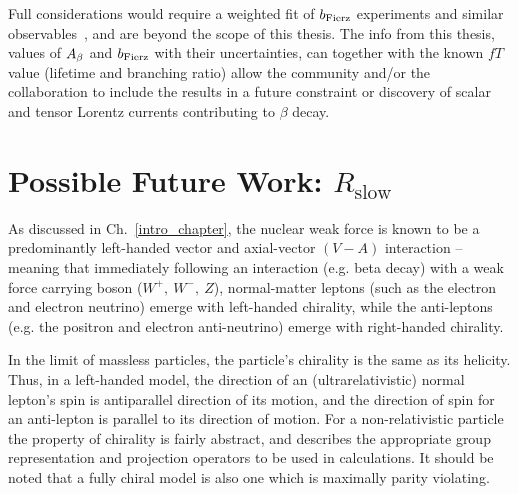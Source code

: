 %
%



Full considerations would require a weighted fit of $b_{\mathrm{Fierz}}$ experiments and similar observables~\cite{Falkowski2021}, and are beyond the scope of this thesis.
The info from this thesis, values of $A_{\beta}$ and $b_{\mathrm{Fierz}}$ with their uncertainties, can together with the known $fT$ value (lifetime and
branching ratio) allow the community and/or the collaboration to include the results in a future constraint or discovery of scalar and tensor Lorentz currents
contributing to $\beta$ decay.


%
\FloatBarrier
\section{Possible Future Work:  $R_{\textrm{slow}}$}
\label{section_rslow}
As discussed in Ch.~\ref{intro_chapter}, the nuclear weak force is known to be a predominantly left-handed vector and axial-vector $(V-A)$ interaction -- meaning that immediately following an interaction (e.g. beta decay) with a weak force carrying boson ($W^+,\: W^-,\: Z$), 
normal-matter leptons (such as the electron and electron neutrino) emerge with left-handed chirality,
while the anti-leptons (e.g. the positron and electron anti-neutrino) emerge with right-handed chirality.  

In the limit of massless particles, the particle's chirality is the same as its helicity. Thus, in a left-handed model, the direction of an (ultrarelativistic) normal lepton's spin is antiparallel direction of its motion, and the direction of spin for an anti-lepton is parallel to its direction of motion.  For a non-relativistic particle the property of chirality is fairly abstract, and describes the appropriate group representation and projection operators to be used in calculations.  It should be noted that a fully chiral model is also one which is maximally parity violating.

